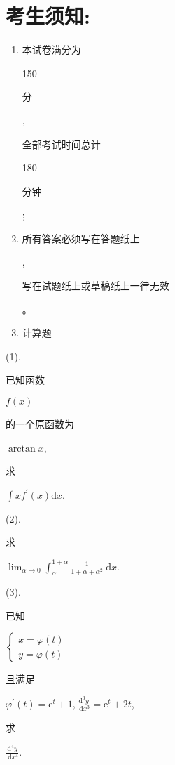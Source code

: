 \documentclass[10pt]{article}
\begin{document}
\section{考生须知:}
\begin{enumerate}
  \item \begin{CJK}{UTF8}{mj}本试卷满分为\end{CJK} 150 \begin{CJK}{UTF8}{mj}分\end{CJK}, \begin{CJK}{UTF8}{mj}全部考试时间总计\end{CJK} 180 \begin{CJK}{UTF8}{mj}分钟\end{CJK};

  \item \begin{CJK}{UTF8}{mj}所有答案必须写在答题纸上\end{CJK}, \begin{CJK}{UTF8}{mj}写在试题纸上或草稿纸上一律无效\end{CJK}。

  \item \begin{CJK}{UTF8}{mj}计算题\end{CJK}

\end{enumerate}
(1). \begin{CJK}{UTF8}{mj}已知函数\end{CJK} $f(x)$ \begin{CJK}{UTF8}{mj}的一个原函数为\end{CJK} $\arctan x$, \begin{CJK}{UTF8}{mj}求\end{CJK} $\int x f^{\prime}(x) \mathrm{d} x$.

(2). \begin{CJK}{UTF8}{mj}求\end{CJK} $\lim _{\alpha \rightarrow 0} \int_{\alpha}^{1+\alpha} \frac{1}{1+\alpha+\alpha^{2}} \mathrm{~d} x$.

(3). \begin{CJK}{UTF8}{mj}已知\end{CJK} $\left\{\begin{array}{l}x=\varphi(t) \\ y=\varphi(t)\end{array}\right.$ \begin{CJK}{UTF8}{mj}且满足\end{CJK} $\varphi^{\prime}(t)=\mathrm{e}^{t}+1, \frac{\mathrm{d}^{3} y}{\mathrm{~d} x^{3}}=\mathrm{e}^{t}+2 t$, \begin{CJK}{UTF8}{mj}求\end{CJK} $\frac{\mathrm{d}^{4} y}{\mathrm{~d} x^{4}}$.
\end{document}
